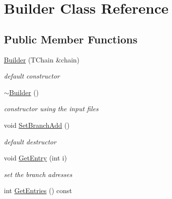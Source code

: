 \hypertarget{class_builder}{}\section{Builder Class Reference}
\label{class_builder}
\subsection*{Public Member Functions}
\begin{DoxyCompactItemize}
\item 
\mbox{\label{class_builder_aad58498c1addcf5b11b13363ee335fce}} 
\mbox{\hyperlink{class_builder_aad58498c1addcf5b11b13363ee335fce}{Builder}} (T\+Chain \&chain)
\begin{DoxyCompactList}\small\item\em default constructor \end{DoxyCompactList}\item 
\mbox{\label{class_builder_a850f1a4be35da17638a4a1ef20bf1401}} 
\mbox{\hyperlink{class_builder_a850f1a4be35da17638a4a1ef20bf1401}{$\sim$\+Builder}} ()
\begin{DoxyCompactList}\small\item\em constructor using the input files \end{DoxyCompactList}\item 
\mbox{\label{class_builder_afcc5191ddec254f62cbc996df7c57c8b}} 
void \mbox{\hyperlink{class_builder_afcc5191ddec254f62cbc996df7c57c8b}{Set\+Branch\+Add}} ()
\begin{DoxyCompactList}\small\item\em default destructor \end{DoxyCompactList}\item 
\mbox{\label{class_builder_a556b14f39a32be83db1db3a65a9057a4}} 
void \mbox{\hyperlink{class_builder_a556b14f39a32be83db1db3a65a9057a4}{Get\+Entry}} (int i)
\begin{DoxyCompactList}\small\item\em set the branch adresses \end{DoxyCompactList}\item 
\mbox{\label{class_builder_a5d63fbb6d38534e7df287abb5f83408e}} 
int \mbox{\hyperlink{class_builder_a5d63fbb6d38534e7df287abb5f83408e}{Get\+Entries}} () const

\end{DoxyCompactItemize}
